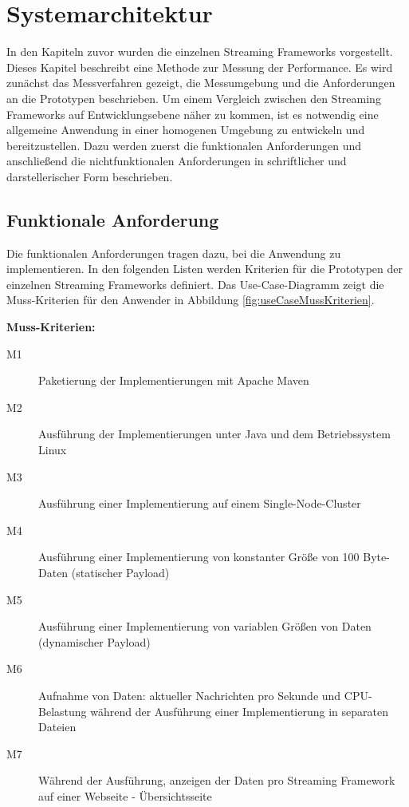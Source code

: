 \chapter{Systemarchitektur}
\label{chapter:systemarchitekur}

In den Kapiteln zuvor wurden die einzelnen Streaming Frameworks vorgestellt. Dieses Kapitel beschreibt eine Methode zur Messung der Performance. Es wird zunächst das Messverfahren gezeigt, die Messumgebung und die Anforderungen an die Prototypen beschrieben. Um einem Vergleich zwischen den Streaming Frameworks auf Entwicklungsebene näher zu kommen, ist es notwendig eine allgemeine Anwendung in einer homogenen Umgebung zu entwickeln und bereitzustellen. Dazu werden zuerst die funktionalen Anforderungen und anschließend die nichtfunktionalen Anforderungen in schriftlicher und darstellerischer Form beschrieben.


\section{Funktionale Anforderung}
\label{sec:funktAnforderung}

Die funktionalen Anforderungen tragen dazu, bei die Anwendung zu implementieren. In den folgenden Listen werden Kriterien für die Prototypen der einzelnen Streaming Frameworks definiert. Das Use-Case-Diagramm zeigt die Muss-Kriterien für den Anwender in Abbildung \ref{fig:useCaseMussKriterien}.

\textbf{Muss-Kriterien:}
\begin{description}
  \item[M1] Paketierung der Implementierungen mit Apache Maven	
	\item[M2] Ausführung der Implementierungen unter Java und dem Betriebssystem Linux
	\item[M3] Ausführung einer Implementierung auf einem Single-Node-Cluster	
	\item[M4] Ausführung einer Implementierung von konstanter Größe von 100 Byte-Daten (statischer Payload)
	\item[M5] Ausführung einer Implementierung von variablen Größen von Daten (dynamischer Payload)
	\item[M6] Aufnahme von Daten: aktueller Nachrichten pro Sekunde und CPU-Belastung während der Ausführung einer Implementierung in  separaten Dateien 
	\item[M7] Während der Ausführung, anzeigen der Daten pro Streaming Framework auf einer Webseite - Übersichtsseite
\end{description}

